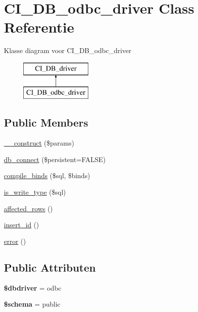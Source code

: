 \hypertarget{class_c_i___d_b__odbc__driver}{}\section{C\+I\+\_\+\+D\+B\+\_\+odbc\+\_\+driver Class Referentie}
\label{class_c_i___d_b__odbc__driver}
Klasse diagram voor C\+I\+\_\+\+D\+B\+\_\+odbc\+\_\+driver\begin{figure}[H]
\begin{center}
\leavevmode
\includegraphics[height=2.000000cm]{class_c_i___d_b__odbc__driver}
\end{center}
\end{figure}
\subsection*{Public Members}
\begin{DoxyCompactItemize}
\item 
\mbox{\hyperlink{class_c_i___d_b__odbc__driver_a9162320adff1a1a4afd7f2372f753a3e}{\+\_\+\+\_\+construct}} (\$params)
\item 
\mbox{\hyperlink{class_c_i___d_b__odbc__driver_a52bf595e79e96cc0a7c907a9b45aeb4d}{db\+\_\+connect}} (\$persistent=F\+A\+L\+SE)
\item 
\mbox{\hyperlink{class_c_i___d_b__odbc__driver_a0ba381d2e9078472bd0167e75cc8033c}{compile\+\_\+binds}} (\$sql, \$binds)
\item 
\mbox{\hyperlink{class_c_i___d_b__odbc__driver_af435df5703c238769d6d16fde6d51182}{is\+\_\+write\+\_\+type}} (\$sql)
\item 
\mbox{\hyperlink{class_c_i___d_b__odbc__driver_a77248aaad33eb132c04cc4aa3f4bc8cb}{affected\+\_\+rows}} ()
\item 
\mbox{\hyperlink{class_c_i___d_b__odbc__driver_a933f2cde8dc7f87875e257d0a4902e99}{insert\+\_\+id}} ()
\item 
\mbox{\hyperlink{class_c_i___d_b__odbc__driver_a43b8d30b879d4f09ceb059b02af2bc02}{error}} ()
\end{DoxyCompactItemize}
\subsection*{Public Attributen}
\begin{DoxyCompactItemize}
\item 
\mbox{\label{class_c_i___d_b__odbc__driver_a0cde2a16322a023d040aa7f725877597}} 
{\bfseries \$dbdriver} = \textquotesingle{}odbc\textquotesingle{}
\item 
\mbox{\label{class_c_i___d_b__odbc__driver_a83022b1d70799d2bde3d64dca9cb40ee}} 
{\bfseries \$schema} = \textquotesingle{}public\textquotesingle{}
\end{DoxyCompactItemize}
